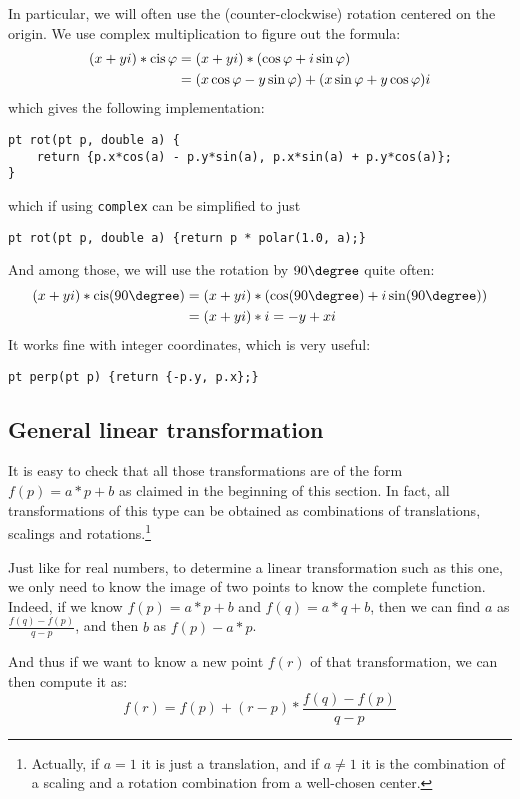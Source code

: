 
In particular, we will often use the (counter-clockwise) rotation centered on the origin. We use complex multiplication to figure out the formula:
\begin{align*}
(x+yi)\ast\operatorname{cis}\varphi &= (x+yi)\ast(\cos\varphi + i\sin\varphi) \\
&= (x\cos\varphi - y\sin\varphi) + (x\sin\varphi + y\cos\varphi)i
\end{align*}
which gives the following implementation:
\begin{lstlisting}
pt rot(pt p, double a) {
    return {p.x*cos(a) - p.y*sin(a), p.x*sin(a) + p.y*cos(a)};
}
\end{lstlisting}
which if using \lstinline|complex| can be simplified to just
\begin{lstlisting}
pt rot(pt p, double a) {return p * polar(1.0, a);}
\end{lstlisting}

And among those, we will use the rotation by $90\degree$ quite often:
\begin{align*}
(x+yi)\ast\cis(90\degree) &= (x+yi)\ast(\cos(90\degree) + i\sin(90\degree)) \\
&= (x+yi)\ast i = -y+xi
\end{align*}
It works fine with integer coordinates, which is very useful:
\begin{lstlisting}
pt perp(pt p) {return {-p.y, p.x};}
\end{lstlisting}

\subsection{General linear transformation}
It is easy to check that all those transformations are of the form $f(p) = a \ast p + b$ as claimed in the beginning of this section. In fact, all transformations of this type can be obtained as combinations of translations, scalings and rotations.\footnote{Actually, if $a = 1$ it is just a translation, and if $a \neq 1$ it is the combination of a scaling and a rotation combination from a well-chosen center.}

Just like for real numbers, to determine a linear transformation such as this one, we only need to know the image of two points to know the complete function. Indeed, if we know $f(p) = a \ast p + b$ and $f(q) = a \ast q + b$, then we can find $a$ as $\frac{f(q)-f(p)}{q-p}$, and then $b$ as $f(p) - a \ast p$.

And thus if we want to know a new point $f(r)$ of that transformation, we can then compute it as:
\[f(r) = f(p) + (r-p) \ast \frac{f(q)-f(p)}{q-p}\]

